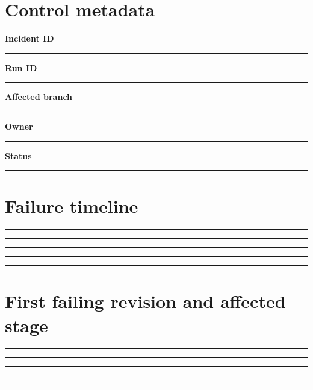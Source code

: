 \documentclass[11pt,letterpaper]{article}
\begin{document}
\makedoctitle\makedocsummary
\section{Control metadata}
\noindent\textbf{Incident ID}\par\nobreak\vspace{6pt}\noindent\rule{0.93\linewidth}{0.4pt}\par\vspace{14pt}
\noindent\textbf{Run ID}\par\nobreak\vspace{6pt}\noindent\rule{0.93\linewidth}{0.4pt}\par\vspace{14pt}
\noindent\textbf{Affected branch}\par\nobreak\vspace{6pt}\noindent\rule{0.93\linewidth}{0.4pt}\par\vspace{14pt}
\noindent\textbf{Owner}\par\nobreak\vspace{6pt}\noindent\rule{0.93\linewidth}{0.4pt}\par\vspace{14pt}
\noindent\textbf{Status}\par\nobreak\vspace{6pt}\noindent\rule{0.93\linewidth}{0.4pt}\par\vspace{14pt}
\section{Failure timeline}
\vspace{2mm}
\noindent\rule{0.93\linewidth}{0.4pt}\par\vspace{13pt}
\noindent\rule{0.93\linewidth}{0.4pt}\par\vspace{13pt}
\noindent\rule{0.93\linewidth}{0.4pt}\par\vspace{13pt}
\noindent\rule{0.93\linewidth}{0.4pt}\par\vspace{13pt}
\noindent\rule{0.93\linewidth}{0.4pt}\par\vspace{13pt}
\section{First failing revision and affected stage}
\vspace{2mm}
\noindent\rule{0.93\linewidth}{0.4pt}\par\vspace{13pt}
\noindent\rule{0.93\linewidth}{0.4pt}\par\vspace{13pt}
\noindent\rule{0.93\linewidth}{0.4pt}\par\vspace{13pt}
\noindent\rule{0.93\linewidth}{0.4pt}\par\vspace{13pt}
\noindent\rule{0.93\linewidth}{0.4pt}\par\vspace{13pt}
\end{document}
